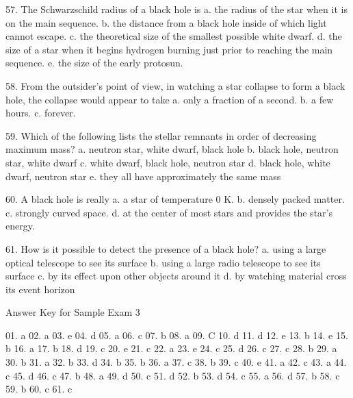   57. The Schwarzschild radius of a black hole is
      a.  the radius of the star when it is on the main sequence.
      b.  the distance from a black hole inside of which light cannot escape.
      c.  the theoretical size of the smallest possible white dwarf.
      d.  the size of a star when it begins hydrogen burning just prior to reaching the main sequence.
      e.  the size of the early protosun.
      
  58. From the outsider's point of view, in watching a star collapse
      to form a black hole, the collapse would appear to take
      a.  only a fraction of a second.
      b.  a few hours.
      c.  forever.
      
  59. Which of the following lists the stellar remnants in order of
      decreasing maximum mass?
      a.  neutron star, white dwarf, black hole
      b.  black hole, neutron star, white dwarf
      c.  white dwarf, black hole, neutron star
      d.  black hole, white dwarf, neutron star
      e.  they all have approximately the same mass
      
  60. A black hole is really
      a.  a star of temperature 0 K.
      b.  densely packed matter.
      c.  strongly curved space.
      d.  at the center of most stars and provides the star's
          energy.
      
  61. How is it possible to detect the presence of a black hole?
      a.  using a large optical telescope to see its surface
      b.  using a large radio telescope to see its surface
      c.  by its effect upon other objects around it
      d.  by watching material cross its event horizon


Answer Key for Sample Exam 3
 
01. a  
02. a  
03. e  
04. d  
05. a  
06. c  
07. b  
08. a  
09. C
10. d   
11. d   
12. e   
13. b   
14. e   
15. b    
16. a   
17. b        
18. d        
19. c        
20. e        
21. c        
22. a        
23. e        
24. c         
25. d         
26. c         
27. c         
28. b         
29. a         
30. b     
31. a         
32. b         
33. d         
34. b         
35. b         
36. a         
37. c         
38. b         
39. c         
40. e         
41. a         
42. c         
43. a    
44. c   
45. d   
46. c   
47. b   
48. a   
49. d   
50. c   
51. d   
52. b   
53. d   
54. c   
55. a   
56. d   
57. b   
58. c   
59. b
60. c   
61. c   


